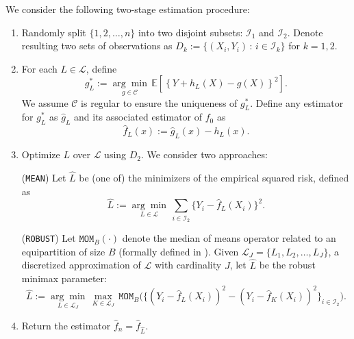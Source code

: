 \documentclass[12pt]{article}
\begin{document}
We consider the following two-stage estimation procedure:
\begin{enumerate}
    \item Randomly split $\{1,2, \ldots, n\}$ into two disjoint subsets: $\mathcal{I}_1$ and $\mathcal{I}_2$. Denote resulting two sets of observations as $D_k := \{(X_i, Y_i)\, : \, i \in \mathcal{I}_k\}$ for $k=1, 2$.
    \item\label{ghat-step} For each $L \in \mathcal{L}$, define
    \begin{equation}\label{eq:fixed-L-gstar}
{g}^*_{L}:=\underset{g \in \mathcal{C}}{\arg \min } \, \mathbb{E}\left[\left\{Y+h_L(X)-g(X)\right\}^2\right].
    \end{equation}
    We assume $\mathcal{C}$ is regular to ensure the uniqueness of $g_L^*$. Define any estimator for $g^*_L$ as $\widehat{g}_L$ and its associated estimator of $f_0$ as
   \begin{equation}\label{eq:fixed-L-estimator-fL}
\widehat{f}_L(x):=\widehat{g}_L(x)-h_L(x).
    \end{equation}
    \item \label{cv-step}Optimize $L$ over $\mathcal{L}$ using $D_2$. We consider two approaches: 
   
        (\texttt{MEAN}) Let $\widehat L$ be (one of) the minimizers of the empirical squared risk, defined as 
        \begin{equation}\label{eq:estimator-of-L}
            \widehat L := \underset{L \in \mathcal{L}}{\arg \min }\,  \sum_{i \in \mathcal{I}_2}\{Y_i - \widehat{f}_L(X_i)\}^2.
        \end{equation}
        
        (\texttt{ROBUST}) Let $\texttt{MOM}_B(\cdot)$ denote the median of means operator related to an equipartition of size $B$ (formally defined in ). Given $\mathcal{L}_J = \{L_1, L_2, \ldots, L_J\}$, a discretized approximation of $\mathcal{L}$ with cardinality $J$, let $\widehat L$ be the robust minimax parameter:
        \begin{equation}\label{eq:risk-estimator-robust}
            \widehat L  := \underset{L \in \mathcal{L}_J}{\arg \min }\,  \max_{K \in \mathcal{L}_J}\, \texttt{MOM}_B\bigg(\{(Y_i - \widehat{f}_L(X_i))^2 - (Y_i - \widehat{f}_{K}(X_i))^2\}_{i \in \mathcal{I}_2}\bigg).
        \end{equation}
    
    \item Return the estimator $\widehat{f}_n = \widehat{f}_{\widehat{L}}$.
\end{enumerate}
\end{document}
